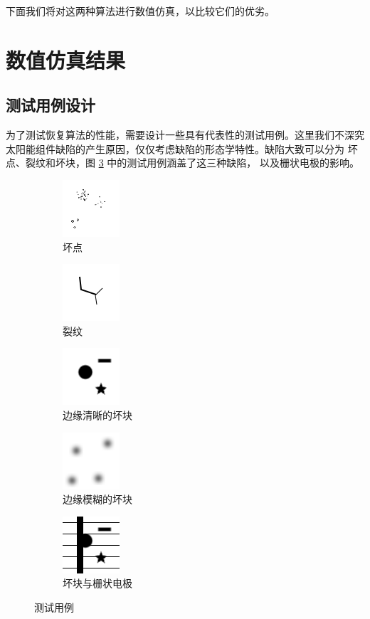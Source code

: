 下面我们将对这两种算法进行数值仿真，以比较它们的优劣。

\section{数值仿真结果}

\subsection{测试用例设计}

为了测试恢复算法的性能，需要设计一些具有代表性的测试用例。这里我们不深究
太阳能组件缺陷的产生原因，仅仅考虑缺陷的形态学特性。缺陷大致可以分为
坏点、裂纹和坏块，图 \ref{fig:testdata} 中的测试用例涵盖了这三种缺陷，
以及栅状电极的影响。

\begin{figure}
\centering
\begin{subfigure}[t]{1in}
	\includegraphics{Figure/testdata/0d.png}
	\caption{坏点}
	\label{fig:testdata:0d}
\end{subfigure}
\begin{subfigure}[t]{1in}
	\includegraphics{Figure/testdata/1d.png}
	\caption{裂纹}
	\label{fig:testdata:1d}
\end{subfigure}
\begin{subfigure}[t]{1in}
	\includegraphics{Figure/testdata/2dsharp.png}
	\caption{边缘清晰的坏块}
\end{subfigure}
\begin{subfigure}[t]{1in}
	\includegraphics{Figure/testdata/2dsmooth.png}
	\caption{边缘模糊的坏块}
\end{subfigure}
\begin{subfigure}[t]{1in}
	\includegraphics{Figure/testdata/2dsharp_finger.png}
	\caption{坏块与栅状电极}
\end{subfigure}
\caption{测试用例}
\label{fig:testdata}
\end{figure}

